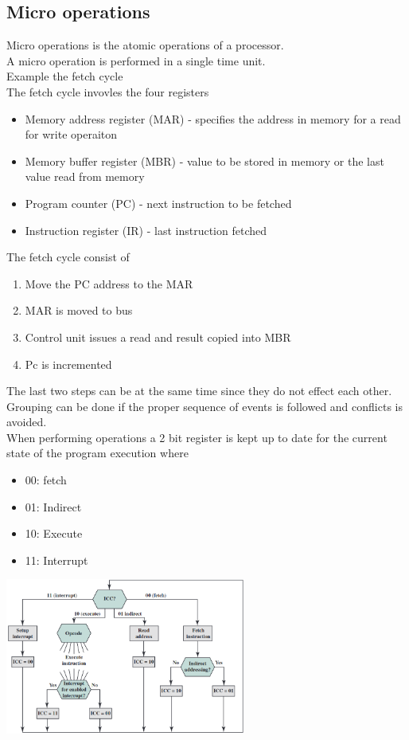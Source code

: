 \documentclass[12pt, a4paper]{article}
\begin{document}
		\subsection{Micro operations}
			Micro operations is the atomic operations of a processor.\\
			A micro operation is performed in a single time unit.\\
			Example the fetch cycle\\
			The fetch cycle invovles the four registers
			\begin{itemize}
				\item Memory address register (MAR) - specifies the address in memory for a read for write operaiton
				\item Memory buffer register (MBR) - value to be stored in memory or the last value read from memory
				\item Program counter (PC) - next instruction to be fetched
				\item Instruction register (IR) - last instruction fetched
			\end{itemize}
			The fetch cycle consist of
			\begin{enumerate}
				\item Move the PC address to the MAR
				\item MAR is moved to bus 
				\item Control unit issues a read and result copied into MBR 
				\item Pc is incremented
			\end{enumerate}
			The last two steps can be at the same time since they do not effect each other.\\
			Grouping can be done if the proper sequence of events is followed and conflicts is avoided.\\
			When performing operations a 2 bit register is kept up to date for the current state of the program execution where
			\begin{itemize}
				\item 00: fetch
				\item 01: Indirect
				\item 10: Execute
				\item 11: Interrupt
			\end{itemize}
			\includegraphics[width=300px]{assets/instructionCycle.png}\\
\end{document}
